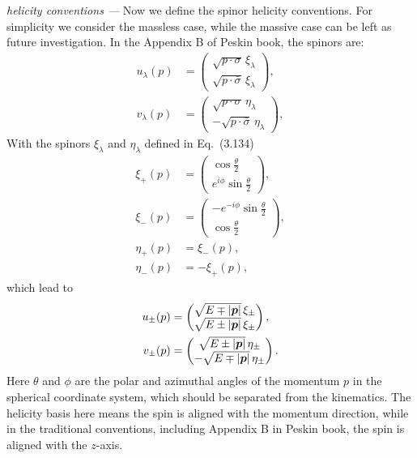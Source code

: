 \documentclass[a4paper,11pt]{article}
\newcommand{\nn}{\nonumber}
\begin{document}
{\emph{helicity conventions ---}}
Now we define the spinor helicity conventions. For simplicity we consider the massless case, while the massive case can be left as future investigation.
In the Appendix B of Peskin book, the spinors are:
\begin{align}
    u_\lambda(p) &= \begin{pmatrix} \sqrt{p\cdot\sigma} \, \xi_\lambda \\ \sqrt{p\cdot\bar{\sigma}} \, \xi_\lambda \end{pmatrix}, \\
    v_\lambda(p) &= \begin{pmatrix} \sqrt{p\cdot\sigma} \, \eta_\lambda \\ -\sqrt{p\cdot\bar{\sigma}} \, \eta_\lambda \end{pmatrix},
\end{align}
With the spinors $\xi_\lambda$ and $\eta_\lambda$ defined in Eq.~(3.134)
\begin{align}
    \xi_+(p) &= \begin{pmatrix} \cos\frac{\theta}{2} \\ e^{i\phi}\sin\frac{\theta}{2} \end{pmatrix}, \nn\\
    \xi_-(p) &= \begin{pmatrix} -e^{-i\phi}\sin\frac{\theta}{2} \\ \cos\frac{\theta}{2} \end{pmatrix}, \nn\\
    \eta_+(p) &= \xi_-(p),  \nn\\
    \eta_-(p) &= -\xi_+(p),
\end{align}
which lead to
\begin{align}
    u_\pm(p) &= \begin{pmatrix} \sqrt{E \mp \abs{\bm p}} \, \xi_\pm \\ \sqrt{E \pm \abs{\bm p}} \, \xi_\pm \end{pmatrix}, \\
    v_\pm(p) &= \begin{pmatrix} \sqrt{E \pm \abs{\bm p}} \, \eta_\pm \\ -\sqrt{E \mp \abs{\bm p}} \, \eta_\pm \end{pmatrix}.
\end{align}
Here $\theta$ and $\phi$ are the polar and azimuthal angles of the momentum $p$ in the spherical coordinate system, which should be separated from the kinematics.
The helicity basis here means the spin is aligned with the momentum direction, while in the traditional conventions, including Appendix B in Peskin book, the spin is aligned with the $z$-axis.
\end{document}
